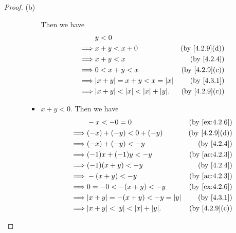 \begin{proof}{(b)}
\begin{itemize}
\begin{itemize}
\begin{itemize}
                          Then we have
                          \begin{align*}
                                     & y < 0                                                                    \\
                            \implies & x + y < x + 0                              & \text{(by \cref{4.2.9}(d))} \\
                            \implies & x + y < x                                  & \text{(by \cref{4.2.4})}    \\
                            \implies & 0 < x + y < x                              & \text{(by \cref{4.2.9}(c))} \\
                            \implies & \abs{x + y} = x + y < x = \abs{x}          & \text{(by \cref{4.3.1})}    \\
                            \implies & \abs{x + y} < \abs{x} < \abs{x} + \abs{y}. & \text{(by \cref{4.2.9}(c))}
                          \end{align*}
                    \item \(x + y < 0\).
                          Then we have
                          \begin{align*}
                                     & -x < -0 = 0                                & \text{(by \cref{ex:4.2.6})} \\
                            \implies & (-x) + (-y) < 0 + (-y)                     & \text{(by \cref{4.2.9}(d))} \\
                            \implies & (-x) + (-y) < -y                           & \text{(by \cref{4.2.4})}    \\
                            \implies & (-1)x + (-1)y < -y                         & \text{(by \cref{ac:4.2.3})} \\
                            \implies & (-1)(x + y) < -y                           & \text{(by \cref{4.2.4})}    \\
                            \implies & -(x + y) < -y                              & \text{(by \cref{ac:4.2.3})} \\
                            \implies & 0 = -0 < -(x + y) < -y                     & \text{(by \cref{ex:4.2.6})} \\
                            \implies & \abs{x + y} = -(x + y) < -y = \abs{y}      & \text{(by \cref{4.3.1})}    \\
                            \implies & \abs{x + y} < \abs{y} < \abs{x} + \abs{y}. & \text{(by \cref{4.2.9}(c))}

\end{align*}
\end{itemize}
\end{itemize}
\end{itemize}
\end{proof}
